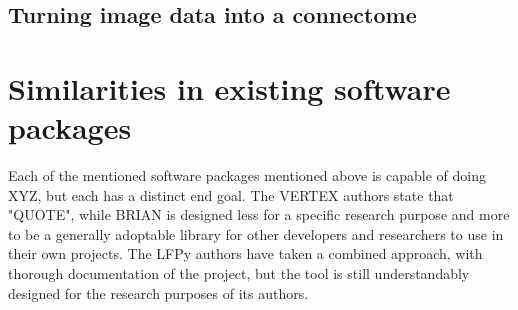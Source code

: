 \subsection{Turning image data into a connectome}

\section{Similarities in existing software packages}

Each of the mentioned software packages mentioned above is capable of doing XYZ,
but each has a distinct end goal. The VERTEX authors state that "QUOTE", while
BRIAN is designed less for a specific research purpose and more to be a
generally adoptable library for other developers and researchers to use in their
own projects. The LFPy authors have taken a combined approach, with thorough
documentation of the project, but the tool is still understandably designed for
the research purposes of its authors.